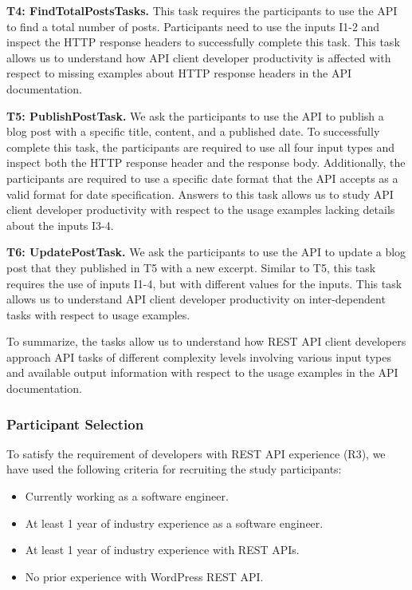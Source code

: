 \documentclass[conference]{IEEEtran}
\begin{document}
\textbf{T4: FindTotalPostsTasks.} This task requires the participants to use the API to find a total number of posts. Participants need to use the inputs I1-2 and inspect the HTTP response headers to successfully complete this task. This task allows us to understand how API client developer productivity is affected with respect to missing examples about HTTP response headers in the API documentation.

\textbf{T5: PublishPostTask.} We ask the participants to use the API to publish a blog post with a specific title, content, and a published date. To successfully complete this task, the participants are required to use all four input types and inspect both the HTTP response header and the response body. Additionally, the participants are required to use a specific date format that the API accepts as a valid format for date specification. Answers to this task allows us to study API client developer productivity with respect to the usage examples lacking details about the inputs I3-4.

\textbf{T6: UpdatePostTask.} We ask the participants to use the API to update a blog post that they published in T5 with a new excerpt. Similar to T5, this task requires the use of inputs I1-4, but with different values for the inputs. This task allows us to understand API client developer productivity on inter-dependent tasks with respect to usage examples.

To summarize, the tasks allow us to understand how REST API client developers approach API tasks of different complexity levels involving various input types and available output information with respect to the usage examples in the API documentation.

\subsubsection{Participant Selection} %

To satisfy the requirement of developers with REST API experience (R3), we have used the following criteria for recruiting the study participants:

\begin{itemize}
  \item Currently working as a software engineer.
  \item At least 1 year of industry experience as a software engineer.
  \item At least 1 year of industry experience with REST APIs.
  \item No prior experience with WordPress REST API.
\end{itemize}
\end{document}
